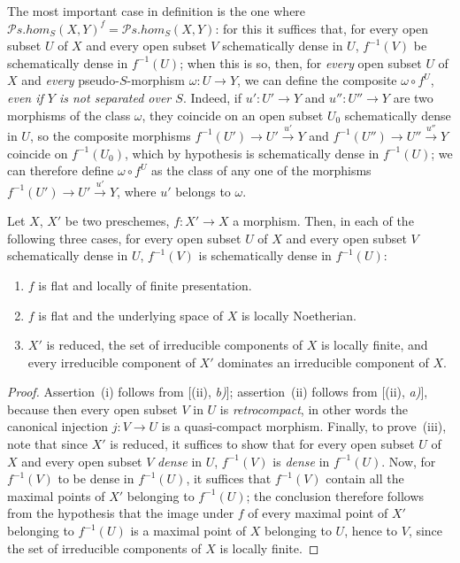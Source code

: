 \begin{env}[20.3.4]
\label{IV.20.3.4}
The most important case in definition  is the one where $\mathscr{P}\!s.\mathit{hom}_S(X,Y)^f=\mathscr{P}\!s.\mathit{hom}_S(X,Y)$: for this it suffices that, for every open subset $U$ of $X$ and every open subset $V$ schematically dense in $U$, $f^{-1}(V)$ be schematically dense in $f^{-1}(U)$; when this is so, then, for \emph{every} open subset $U$ of $X$ and \emph{every} pseudo-$S$-morphism $\omega:U\to Y$, we can define the composite $\omega\circ f^U$, \emph{even if $Y$ is not separated over $S$}.
Indeed, if $u':U'\to Y$ and $u'':U''\to Y$ are two morphisms of the class $\omega$, they coincide on an open subset $U_0$ schematically dense in $U$, so the composite morphisms $f^{-1}(U')\to U'\xrightarrow{u'}Y$ and $f^{-1}(U'')\to U''\xrightarrow{u''}Y$ coincide on $f^{-1}(U_0)$, which by hypothesis is schematically dense in $f^{-1}(U)$; we can therefore define $\omega\circ f^U$ as the class of any one of the morphisms $f^{-1}(U')\to U'\xrightarrow{u'}Y$, where $u'$ belongs to $\omega$.
\end{env}

\begin{proposition}[20.3.5]\label{IV.20.3.5}
Let $X$, $X'$ be two preschemes, $f:X'\to X$ a morphism.
Then, in each of the following three cases, for every open subset $U$ of $X$ and every open subset $V$ schematically dense in $U$, $f^{-1}(V)$ is schematically dense in $f^{-1}(U)$:
\begin{enumerate}[label=\emph{(\roman*)}]
  \item $f$ is flat and locally of finite presentation.
  \item $f$ is flat and the underlying space of $X$ is locally Noetherian.
  \item $X'$ is reduced, the set of irreducible components of $X$ is locally finite, and every irreducible component of $X'$ dominates an irreducible component of $X$.
\end{enumerate}
\end{proposition}

\begin{proof}
Assertion~(i) follows from [(ii), \emph{b)}]; assertion~(ii) follows from [(ii), \emph{a)}], because then every open subset $V$ in $U$ is \emph{retrocompact}, in other words the canonical injection $j:V\to U$ is a quasi-compact morphism.
Finally, to prove~(iii), note that since $X'$ is reduced, it suffices to show that for every open subset $U$ of $X$ and every open subset $V$ \emph{dense} in $U$, $f^{-1}(V)$ is \emph{dense} in $f^{-1}(U)$.
Now, for $f^{-1}(V)$ to be dense in $f^{-1}(U)$, it suffices that $f^{-1}(V)$ contain all the maximal points of $X'$ belonging to $f^{-1}(U)$; the conclusion therefore follows from the hypothesis that the image under $f$ of every
maximal point of $X'$ belonging to $f^{-1}(U)$ is a maximal point of $X$ belonging to $U$, hence to $V$, since the set of irreducible components of $X$ is locally finite.
\end{proof}

